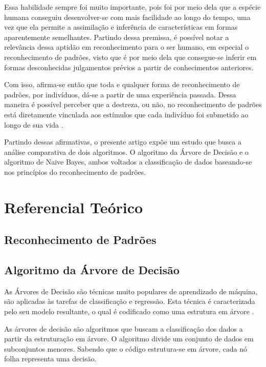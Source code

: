 \documentclass[preprint,12pt,times]{elsarticle}
\begin{document}
	Essa habilidade sempre foi muito importante, pois foi por meio dela que a espécie humana conseguiu desenvolver-se com mais facilidade ao longo do tempo, uma vez que ela permite a assimilação e inferência de características em formas aparentemente semelhantes. Partindo dessa premissa, é possível notar a relevância dessa aptidão em reconhecimento para o ser humano, em especial o reconhecimento de padrões, visto que é por meio dela que consegue-se inferir em formas desconhecidas julgamentos prévios a partir de conhecimentos anteriores.
	
	Com isso, afirma-se então que toda e qualquer forma de reconhecimento de padrões, por indivíduos, dá-se a partir de uma experiência passada. Dessa maneira é possível perceber que a destreza, ou não, no reconhecimento de padrões está diretamente vinculada aos estímulos que cada indivíduo foi submetido ao longo de sua vida \cite{Prado:2008}.
	
	Partindo dessas afirmativas, o presente artigo expõe um estudo que busca a análise comparativa de dois algoritmos. O algoritmo da Árvore de Decisão e o algoritmo de Naive Bayes, ambos voltados a classificação de dados baseando-se nos princípios do reconhecimento de padrões.
	
	\section{Referencial Teórico}
	\label{Referencial Teórico}
	
	\subsection{Reconhecimento de Padrões}
	
	\subsection{Algoritmo da Árvore de Decisão}
	
	As  Árvores de Decisão são técnicas muito populares de aprendizado de máquina, são aplicadas às tarefas de classificação e regressão. Esta técnica é caracterizada pelo seu modelo resultante, o qual é codificado como uma estrutura em árvore \cite{Nuti:2019}.
	
	As árvores de decisão são algoritmos que buscam a classificação dos dados a partir da estruturação em árvore. O algoritmo divide um conjunto de dados em subconjuntos menores. Sabendo que o código estrutura-se em árvore, cada nó folha representa uma decisão.
	
\end{document}
